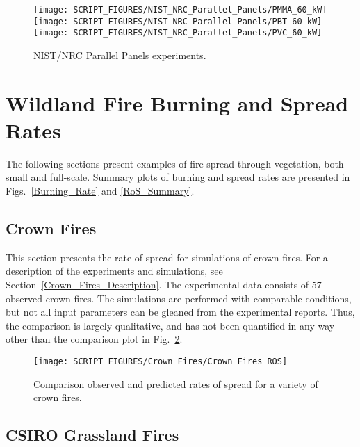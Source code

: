 \begin{figure}[!ht]
\centering
\texttt{[image: SCRIPT\_FIGURES/NIST\_NRC\_Parallel\_Panels/PMMA\_60\_kW]} \\
\texttt{[image: SCRIPT\_FIGURES/NIST\_NRC\_Parallel\_Panels/PBT\_60\_kW]} \\
\texttt{[image: SCRIPT\_FIGURES/NIST\_NRC\_Parallel\_Panels/PVC\_60\_kW]}
\caption[NIST/NRC Parallel Panels experiments]{NIST/NRC Parallel Panels experiments.}
\label{NIST_NRC_PP_HRR}
\end{figure}


\clearpage

\section{Wildland Fire Burning and Spread Rates}
\label{WUI}

The following sections present examples of fire spread through vegetation, both small and full-scale. Summary plots of burning and spread rates are presented in Figs.~\ref{Burning_Rate} and \ref{RoS_Summary}.


\subsection{Crown Fires}

This section presents the rate of spread for simulations of crown fires. For a description of the experiments and simulations, see Section~\ref{Crown_Fires_Description}. The experimental data consists of 57 observed crown fires. The simulations are performed with comparable conditions, but not all input parameters can be gleaned from the experimental reports. Thus, the comparison is largely qualitative, and has not been quantified in any way other than the comparison plot in Fig.~\ref{Crown_Fire_Plot}.

\begin{figure}[ht]
\centering
\texttt{[image: SCRIPT\_FIGURES/Crown\_Fires/Crown\_Fires\_ROS]}
\caption[Comparison observed and predicted rates of spread for a variety of crown fires]{Comparison observed and predicted rates of spread for a variety of crown fires.}
\label{Crown_Fire_Plot}
\end{figure}


\clearpage


\subsection{CSIRO Grassland Fires}

